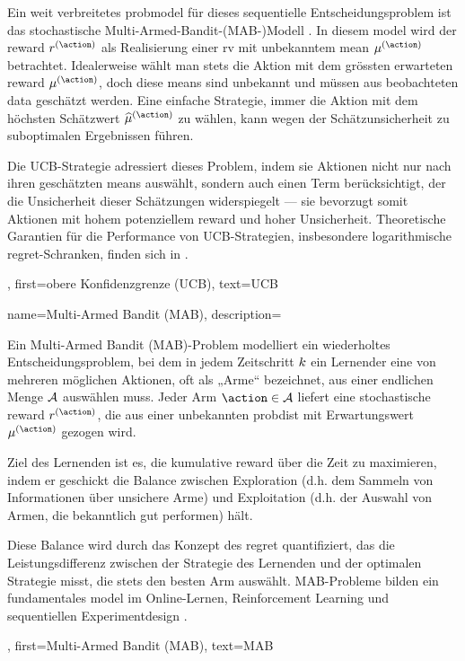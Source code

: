 {{{{{		Ein weit verbreitetes \gls{probmodel} für dieses sequentielle Entscheidungsproblem 
		ist das stochastische Multi-Armed-Bandit-(MAB-)Modell \cite{Bubeck2012}. In diesem \gls{model} 
		wird der \gls{reward} $\reward^{(\action)}$ als Realisierung einer \gls{rv} mit unbekanntem 
		\gls{mean} $\mu^{(\action)}$ betrachtet. Idealerweise wählt man stets die Aktion mit dem 
		grössten erwarteten \gls{reward} $\mu^{(\action)}$, doch diese \gls{mean}s sind unbekannt 
		und müssen aus beobachteten \gls{data} geschätzt werden. Eine einfache Strategie, immer die Aktion 
		mit dem höchsten Schätzwert $\widehat{\mu}^{(\action)}$ zu wählen, kann wegen der 
		Schätzunsicherheit zu suboptimalen Ergebnissen führen. 
		
		Die UCB-Strategie adressiert dieses Problem, indem sie Aktionen nicht nur nach ihren geschätzten 
		\gls{mean}s auswählt, sondern auch einen Term berücksichtigt, der die Unsicherheit dieser 
		Schätzungen widerspiegelt — sie bevorzugt somit Aktionen mit hohem potenziellem \gls{reward} 
		und hoher Unsicherheit. Theoretische Garantien für die Performance von UCB-Strategien, 
		insbesondere logarithmische \gls{regret}-Schranken, finden sich in \cite{Bubeck2012}.},
	first={obere Konfidenzgrenze (UCB)}, text={UCB}
}

{
	name={Multi-Armed Bandit (MAB)},
	description={Ein Multi-Armed Bandit (MAB)-Problem modelliert ein wiederholtes Entscheidungsproblem, 
		bei dem in jedem Zeitschritt $k$ ein Lernender eine von mehreren möglichen Aktionen, oft als „Arme“ bezeichnet, aus einer endlichen Menge 
		$\mathcal{A}$ auswählen muss. Jeder Arm $\action \in \actionset$ liefert eine stochastische \gls{reward} $\reward^{(\action)}$, 
		die aus einer unbekannten \gls{probdist} mit Erwartungswert $\mu^{(\action)}$ gezogen wird. 
		
		Ziel des Lernenden ist es, die kumulative \gls{reward} über die Zeit zu maximieren, indem er geschickt die Balance zwischen Exploration 
		(d.h. dem Sammeln von Informationen über unsichere Arme) und Exploitation (d.h. der Auswahl von Armen, die bekanntlich gut performen) hält. 
		
		Diese Balance wird durch das Konzept des \gls{regret} quantifiziert, das die Leistungsdifferenz zwischen der Strategie des Lernenden und der optimalen Strategie misst, 
		die stets den besten Arm auswählt. MAB-Probleme bilden ein fundamentales \gls{model} im Online-Lernen, Reinforcement Learning und sequentiellen Experimentdesign \cite{Bubeck2012}.},
	first={Multi-Armed Bandit (MAB)}, text={MAB}
}

}}}
